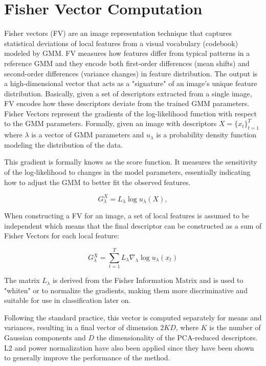 \section{Fisher Vector Computation}
\label{sec:fisher_vector_computation}
Fisher vectors (FV) are an image representation technique that captures statistical deviations of local features from a visual vocabulary (codebook) modeled by GMM. FV measures how features differ from typical patterns in a reference GMM and they encode both first-order differences (mean shifts) and second-order differences (variance changes) in feature distribution. The output is a high-dimensional vector that acts as a "signature" of an image's unique feature distribution. Basically, given a set of descriptors extracted from a single image, FV encodes how these descriptors deviate from the trained GMM parameters. Fisher Vectors represent the gradients of the log-likelihood function with respect to the GMM parameters. Formally, given an image with descriptors $X = \{x_t\}_{t=1}^{T}$ where $\lambda$ is a vector of GMM parameters and $u_\lambda$ is a probability density function modeling the distribution of the data. 

This gradient is formally knows as the score function\cite{springerSpeciesAgnosticPatterned}. It measures the sensitivity of the log-likelihood to changes in the model parameters, essentially indicating how to adjust the GMM to better fit the observed features. 

\begin{equation}
G_\lambda^X = L_\lambda \log u_\lambda(X),
\end{equation}

When constructing a FV for an image, a set of local features is assumed to be independent which means that the final descriptor can be constructed as a sum of Fisher Vectors for each local feature:\cite{springerSpeciesAgnosticPatterned}

\begin{equation}
G{_\lambda^{X}} = \sum_{t = 1}^{T} L_{\lambda} \nabla_{\lambda} \log u_{\lambda}(x_t)
\end{equation}

The matrix $L_\lambda$ is derived from the Fisher Information Matrix and is used to "whiten" or to normalize the gradients\cite{article}, making them more discriminative and suitable for use in classification later on.

Following the standard practice, this vector is computed separately for means and variances, resulting in a final vector of dimension $2KD$, where $K$ is the number of Gaussian components and $D$ the dimensionality of the PCA-reduced descriptors. L2 and power normalization have also been applied since they have been shown\cite{10.1007/978-3-642-15561-1_11} to generally improve the performance of the method.

